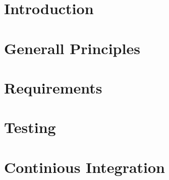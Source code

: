 \documentclass{article}
\begin{document}
	
	\clearpage
	
	\tableofcontents
	\clearpage
	
	\section{Introduction}
	
	\section{Generall Principles}
	
	\section{Requirements}
	
	\section{Testing}
	
	\section{Continious Integration}
	
	
\end{document}

